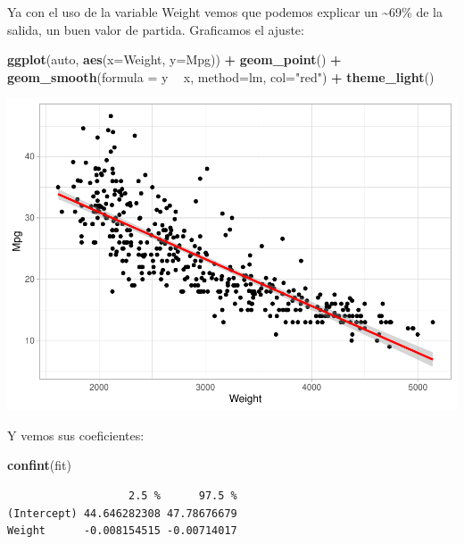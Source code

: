 \documentclass[
]{article}
\newenvironment{Shaded}{\begin{snugshade}}{\end{snugshade}}
\newcommand{\DataTypeTok}[1]{\textcolor[rgb]{0.13,0.29,0.53}{#1}}
\newcommand{\KeywordTok}[1]{\textcolor[rgb]{0.13,0.29,0.53}{\textbf{#1}}}
\newcommand{\NormalTok}[1]{#1}
\newcommand{\OperatorTok}[1]{\textcolor[rgb]{0.81,0.36,0.00}{\textbf{#1}}}
\newcommand{\StringTok}[1]{\textcolor[rgb]{0.31,0.60,0.02}{#1}}
\begin{document}
Ya con el uso de la variable Weight vemos que podemos explicar un
\textasciitilde69\% de la salida, un buen valor de partida. Graficamos
el ajuste:

\begin{Shaded}
\begin{Highlighting}[]
\KeywordTok{ggplot}\NormalTok{(auto, }\KeywordTok{aes}\NormalTok{(}\DataTypeTok{x=}\NormalTok{Weight, }\DataTypeTok{y=}\NormalTok{Mpg)) }\OperatorTok{+}
\StringTok{  }\KeywordTok{geom_point}\NormalTok{() }\OperatorTok{+}
\StringTok{  }\KeywordTok{geom_smooth}\NormalTok{(}\DataTypeTok{formula =}\NormalTok{ y }\OperatorTok{~}\StringTok{ }\NormalTok{x, }\DataTypeTok{method=}\NormalTok{lm, }\DataTypeTok{col=}\StringTok{"red"}\NormalTok{) }\OperatorTok{+}
\StringTok{  }\KeywordTok{theme_light}\NormalTok{()}
\end{Highlighting}
\end{Shaded}

\begin{center}\includegraphics{Regresion_files/figure-latex/unnamed-chunk-6-1} \end{center}

Y vemos sus coeficientes:

\begin{Shaded}
\begin{Highlighting}[]
\KeywordTok{confint}\NormalTok{(fit)}
\end{Highlighting}
\end{Shaded}

\begin{verbatim}
                   2.5 %      97.5 %
(Intercept) 44.646282308 47.78676679
Weight      -0.008154515 -0.00714017
\end{verbatim}
\end{document}

